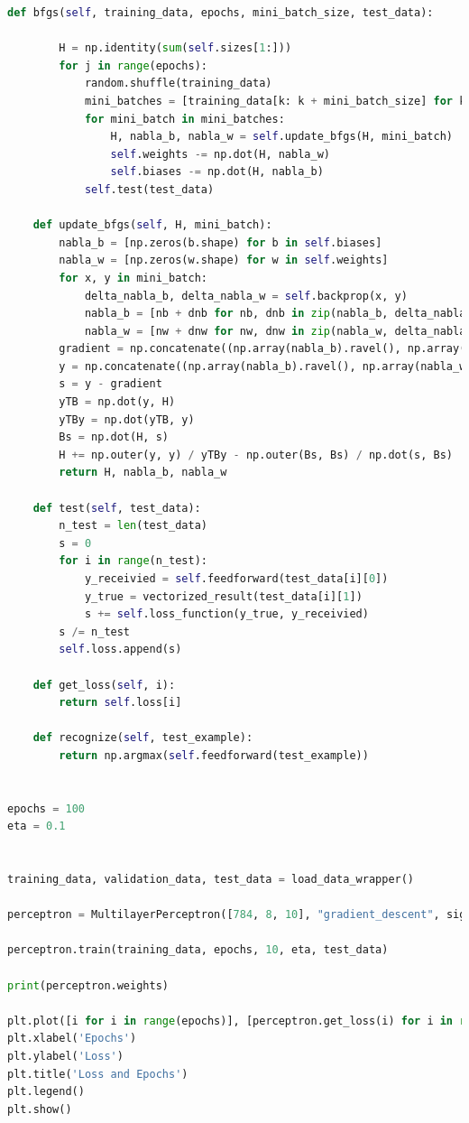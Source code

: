 \documentclass[a4paper, 14pt]{extarticle}
\begin{document}
\begin{lstlisting}[language={python},caption={Многослойный персептрон},label={lst:code1}]
    def bfgs(self, training_data, epochs, mini_batch_size, test_data):

        H = np.identity(sum(self.sizes[1:]))
        for j in range(epochs):
            random.shuffle(training_data)
            mini_batches = [training_data[k: k + mini_batch_size] for k in range(0, len(training_data), mini_batch_size)]
            for mini_batch in mini_batches:
                H, nabla_b, nabla_w = self.update_bfgs(H, mini_batch)
                self.weights -= np.dot(H, nabla_w)
                self.biases -= np.dot(H, nabla_b)
            self.test(test_data)

    def update_bfgs(self, H, mini_batch):
        nabla_b = [np.zeros(b.shape) for b in self.biases]
        nabla_w = [np.zeros(w.shape) for w in self.weights]
        for x, y in mini_batch:
            delta_nabla_b, delta_nabla_w = self.backprop(x, y)
            nabla_b = [nb + dnb for nb, dnb in zip(nabla_b, delta_nabla_b)]
            nabla_w = [nw + dnw for nw, dnw in zip(nabla_w, delta_nabla_w)]
        gradient = np.concatenate((np.array(nabla_b).ravel(), np.array(nabla_w).ravel()))
        y = np.concatenate((np.array(nabla_b).ravel(), np.array(nabla_w).ravel()))
        s = y - gradient
        yTB = np.dot(y, H)
        yTBy = np.dot(yTB, y)
        Bs = np.dot(H, s)
        H += np.outer(y, y) / yTBy - np.outer(Bs, Bs) / np.dot(s, Bs)
        return H, nabla_b, nabla_w

    def test(self, test_data):
        n_test = len(test_data)
        s = 0
        for i in range(n_test):
            y_receivied = self.feedforward(test_data[i][0])
            y_true = vectorized_result(test_data[i][1])
            s += self.loss_function(y_true, y_receivied)
        s /= n_test
        self.loss.append(s)

    def get_loss(self, i):
        return self.loss[i]

    def recognize(self, test_example):
        return np.argmax(self.feedforward(test_example))


epochs = 100
eta = 0.1


training_data, validation_data, test_data = load_data_wrapper()

perceptron = MultilayerPerceptron([784, 8, 10], "gradient_descent", sigmoid, mse)

perceptron.train(training_data, epochs, 10, eta, test_data)

print(perceptron.weights)

plt.plot([i for i in range(epochs)], [perceptron.get_loss(i) for i in range(epochs)], label='Gradient', color='blue')
plt.xlabel('Epochs')
plt.ylabel('Loss')
plt.title('Loss and Epochs')
plt.legend()
plt.show()


\end{lstlisting}
\end{document}
